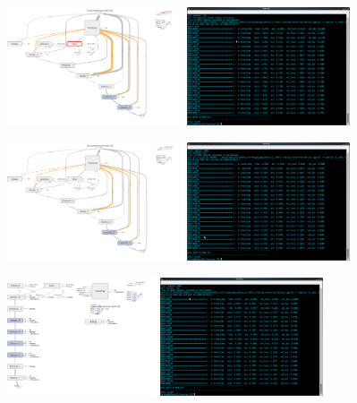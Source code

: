 \documentclass[a4paper]{article}
\begin{document}
\begin{minipage}[t]{0.45\textwidth}
\includegraphics[height=3.5cm,width=\textwidth]{linear_output.png}
\includegraphics[height=3.5cm,width=\textwidth]{linear_output_training.png}
\end{minipage}
\hfill
\begin{minipage}[t]{0.45\textwidth}
\includegraphics[height=3.5cm,width=\textwidth]{tanh_sigmoid_graph.png}
\includegraphics[height=3.5cm,width=\textwidth]{tanh_sigmoid_training.png}
\end{minipage}

\begin{minipage}[t]{0.45\textwidth}
\includegraphics[height=3.5cm,width=\textwidth]{fc_graph.png}
\includegraphics[height=3.5cm,width=\textwidth]{fc_training.png}
\end{minipage}
\hfill
\end{document}

